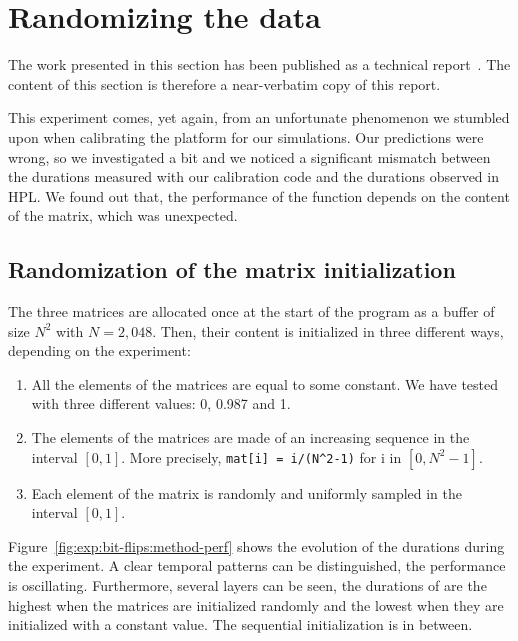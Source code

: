     \section{Randomizing the data}%
    \label{sec:randomizing_data}
        The work presented in this section has been published as a technical report~\cite{cornebize:bitflips}. The
        content of this section is therefore a near-verbatim copy of this report.

        This experiment comes, yet again, from an unfortunate phenomenon we stumbled upon when calibrating the platform
        for our simulations. Our predictions were wrong, so we investigated a bit and we noticed a significant mismatch
        between the durations measured with our calibration code and the durations observed in HPL. We found out that,
        the performance of the \dgemm function depends on the content of the matrix, which was unexpected.

        \subsection{Randomization of the matrix initialization}
        \label{sub:randomization_matrix_initialization}
            The three matrices are allocated once at the start of the program as a buffer of size \(N^2\) with
            \(N=2,048\). Then, their content is initialized in three different ways, depending on the experiment:
            \begin{enumerate}
                \item All the elements of the matrices are equal to some constant. We have tested with three different
                    values: 0, 0.987 and 1.
                \item The elements of the matrices are made of an increasing sequence in the interval \([0, 1]\). More
                    precisely, \texttt{mat[i] = i/(N\textasciicircum{}2-1)} for i in \([0, N^2-1]\).
                \item Each element of the matrix is randomly and uniformly sampled in the interval \([0, 1]\).
            \end{enumerate}

        Figure~\ref{fig:exp:bit-flips:method-perf} shows the evolution of the \dgemm durations during the experiment.
        A clear temporal patterns can be distinguished, the performance is oscillating.  Furthermore, several layers can
        be seen, the durations of \dgemm are the highest when the matrices are initialized randomly and the
        lowest when they are initialized with a constant value. The sequential initialization is in between.

